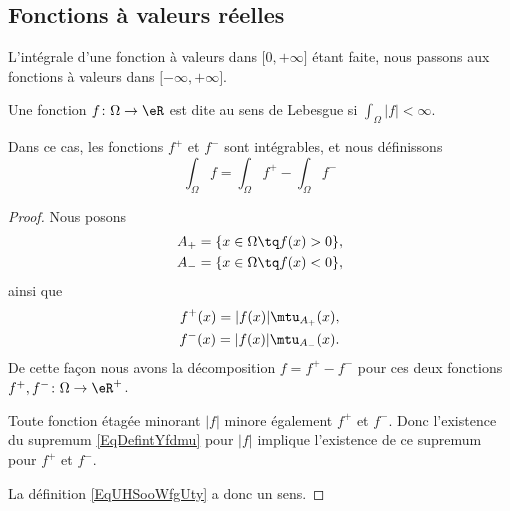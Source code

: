 \subsection{Fonctions à valeurs réelles}

L'intégrale d'une fonction à valeurs dans \( \mathopen[ 0 , +\infty \mathclose]\) étant faite, nous passons aux fonctions à valeurs dans \( \mathopen[ -\infty, +\infty \mathclose]\).

\begin{propositionDef}  \label{DefTCXooAstMYl}
    Une fonction \( f\colon \Omega\to \eR\) est dite  au sens de Lebesgue si \( \int_{\Omega}| f |<\infty\). 

    Dans ce cas, les fonctions \( f^+\) et \( f^-\) sont intégrables, et nous définissons
    \begin{equation}    \label{EqUHSooWfgUty}
        \int_{\Omega}f=\int_{\Omega}f^+-\int_{\Omega}f^-
    \end{equation}
\end{propositionDef}

\begin{proof}
    Nous posons 
    \begin{subequations}
        \begin{align}
            A_+=\{ x\in \Omega\tq f(x)>0 \},\\
            A_-=\{ x\in \Omega\tq f(x)<0 \},
        \end{align}
    \end{subequations}
    ainsi que
    \begin{subequations}
        \begin{align}
            f^+(x)=| f(x) |\mtu_{A_+}(x),\\
            f^-(x)=| f(x) |\mtu_{A_-}(x).
        \end{align}
    \end{subequations}
    De cette façon nous avons la décomposition \( f=f^+-f^-\) pour ces deux fonctions \( f^+,f^-\colon \Omega\to \eR^+\).

    Toute fonction étagée minorant \( | f |\) minore également \( f^+\) et \( f^-\). Donc l'existence du supremum \eqref{EqDefintYfdmu} pour \( | f |\) implique l'existence de ce supremum pour \( f^+\) et \( f^-\).

    La définition \eqref{EqUHSooWfgUty} a donc un sens.
\end{proof}

